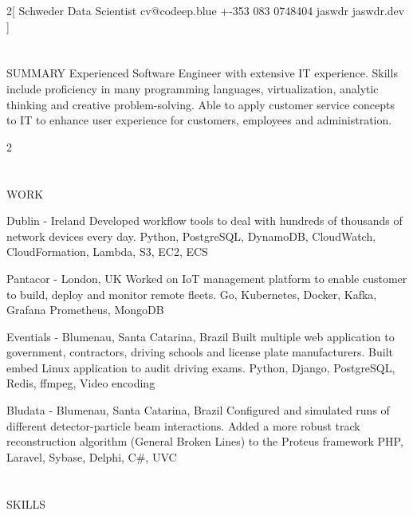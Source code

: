 \documentclass{my_cv}
\begin{document}
\begin{multicols}{2}[
        {Schweder}%
        {Data Scientist}%
        {cv@codeep.blue}%
        {+-353 083 0748404}%
        {jaswdr}%
        {jaswdr.dev}%
]
\end{multicols}

\section{\faFileText}{SUMMARY}
Experienced Software Engineer with extensive IT experience. Skills include proficiency in many programming languages, virtualization, analytic thinking and creative problem-solving. Able to apply customer service concepts to IT to enhance user experience for customers, employees and administration.

\begin{multicols}{2}
\section{\faPencil}{WORK}

%
    {Dublin - Ireland}%
    {Developed workflow tools to deal with hundreds of thousands of network devices every day.}
    {Python, PostgreSQL, DynamoDB, CloudWatch, CloudFormation, Lambda, S3, EC2, ECS}

%
    {Pantacor - London, UK}%
    {Worked on IoT management platform to enable customer to build, deploy and monitor remote fleets.}%
    {Go, Kubernetes, Docker, Kafka, Grafana Prometheus, MongoDB}

%
    {Eventials - Blumenau, Santa Catarina, Brazil}%
    {Built multiple web application to government, contractors, driving schools and license plate manufacturers. Built embed Linux application to audit driving exams.}%
    {Python, Django, PostgreSQL, Redis, ffmpeg, Video encoding}

%
    {Bludata - Blumenau, Santa Catarina, Brazil}%
    {Configured and simulated runs of different detector-particle beam interactions. Added a more robust track reconstruction algorithm (General Broken Lines) to the Proteus framework}
    {PHP, Laravel, Sybase, Delphi, C\#, UVC}%

\section{\faList}{SKILLS}


\end{multicols}
\end{document}
